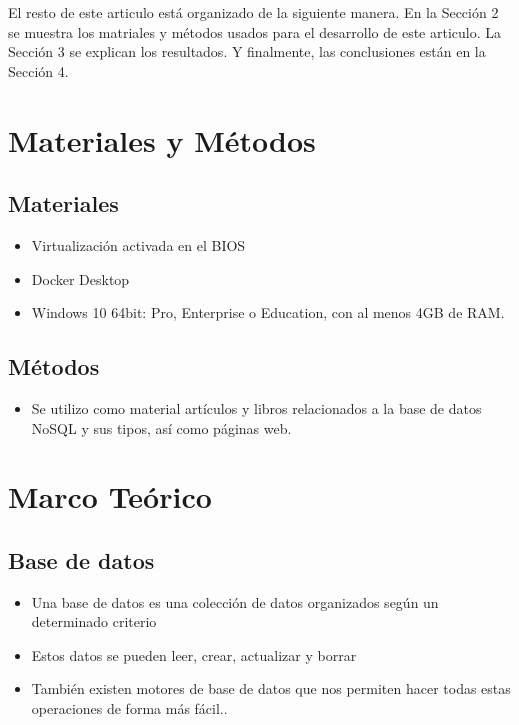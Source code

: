 \documentclass[%
 reprint,
 amsmath,amssymb,
 aps,
]{revtex4-1}
\begin{document}
\par El resto de este articulo está organizado de la siguiente manera. En la Sección 2 se muestra los matriales y métodos usados para el desarrollo de este articulo. La Sección 3 se explican los resultados. Y finalmente, las conclusiones están en la Sección 4.



\section{Materiales y Métodos}\label{sec:2}
\subsection{Materiales}
	\begin{itemize}
		\item Virtualización activada en el BIOS
		\item Docker Desktop
		\item Windows 10 64bit: Pro, Enterprise o Education, con al menos 4GB de RAM.
	\end{itemize}
\subsection{Métodos}
	\begin{itemize}
		\item Se utilizo como material artículos y libros relacionados a la base de datos NoSQL y sus tipos, así como páginas web.
	\end{itemize}
\section{Marco Teórico}\label{sec:3}
\subsection{Base de datos}
	          \begin{itemize}
		\item Una base de datos es una colección de datos organizados según un determinado criterio
		\item Estos datos se pueden leer, crear, actualizar y borrar
		\item También existen motores de base de datos que nos permiten hacer todas estas operaciones de forma más fácil..\cite{Nicolas}
	          \end{itemize}
\end{document}
